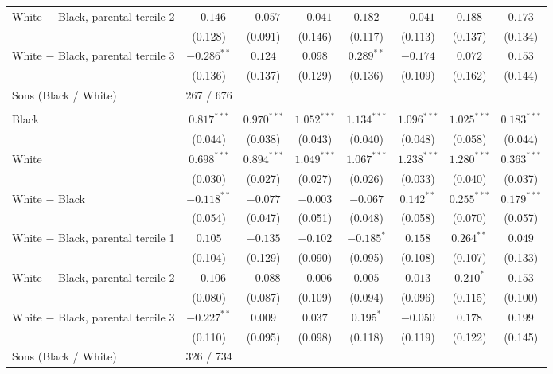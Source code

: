 \begin{table}[!htbp]
{{\begin{tabular}{lccccccc}
White $-$ Black, parental tercile 2 & $-0.146$ & $-0.057$ & $-0.041$ & $0.182$ & $-0.041$ & $0.188$ & $0.173$ \\
 & (0.128) & (0.091) & (0.146) & (0.117) & (0.113) & (0.137) & (0.134) \\
White $-$ Black, parental tercile 3 & $-0.286^{**}$ & $0.124$ & $0.098$ & $0.289^{**}$ & $-0.174$ & $0.072$ & $0.153$ \\
 & (0.136) & (0.137) & (0.129) & (0.136) & (0.109) & (0.162) & (0.144) \\
Sons (Black / White) & 267 / 676 &  &  &  &  &  &  \\
\addlinespace
\multicolumn{8}{l}{\textit{Family income}} \\
Black & $0.817^{***}$ & $0.970^{***}$ & $1.052^{***}$ & $1.134^{***}$ & $1.096^{***}$ & $1.025^{***}$ & $0.183^{***}$ \\
 & (0.044) & (0.038) & (0.043) & (0.040) & (0.048) & (0.058) & (0.044) \\
White & $0.698^{***}$ & $0.894^{***}$ & $1.049^{***}$ & $1.067^{***}$ & $1.238^{***}$ & $1.280^{***}$ & $0.363^{***}$ \\
 & (0.030) & (0.027) & (0.027) & (0.026) & (0.033) & (0.040) & (0.037) \\
White $-$ Black & $-0.118^{**}$ & $-0.077$ & $-0.003$ & $-0.067$ & $0.142^{**}$ & $0.255^{***}$ & $0.179^{***}$ \\
 & (0.054) & (0.047) & (0.051) & (0.048) & (0.058) & (0.070) & (0.057) \\
White $-$ Black, parental tercile 1 & $0.105$ & $-0.135$ & $-0.102$ & $-0.185^{*}$ & $0.158$ & $0.264^{**}$ & $0.049$ \\
 & (0.104) & (0.129) & (0.090) & (0.095) & (0.108) & (0.107) & (0.133) \\
White $-$ Black, parental tercile 2 & $-0.106$ & $-0.088$ & $-0.006$ & $0.005$ & $0.013$ & $0.210^{*}$ & $0.153$ \\
 & (0.080) & (0.087) & (0.109) & (0.094) & (0.096) & (0.115) & (0.100) \\
White $-$ Black, parental tercile 3 & $-0.227^{**}$ & $0.009$ & $0.037$ & $0.195^{*}$ & $-0.050$ & $0.178$ & $0.199$ \\
 & (0.110) & (0.095) & (0.098) & (0.118) & (0.119) & (0.122) & (0.145) \\
Sons (Black / White) & 326 / 734 &  &  &  &  &  &  \\
\bottomrule
\end{tabular}}}
\par\smallskip

\end{table}
